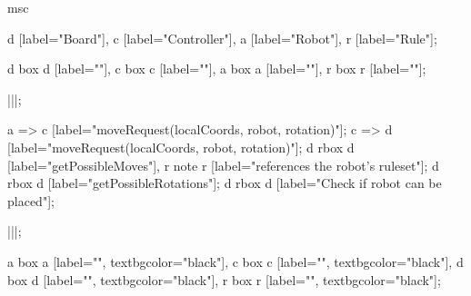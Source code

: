 \begin{msc}
msc
{

d [label="Board"],
c [label="Controller"],
a [label="Robot"],
r [label="Rule"];

d box d [label=""],
c box c [label=""],
a box a [label=""],
r box r [label=""];

|||;

a => c [label="moveRequest(localCoords, robot, rotation)"];
c => d [label="moveRequest(localCoords, robot, rotation)"];
d rbox d [label="getPossibleMoves"], r note r [label="references the robot's ruleset"];
d rbox d [label="getPossibleRotations"];
d rbox d [label="Check if robot can be placed"];

|||;

a box a [label="", textbgcolor="black"],
c box c [label="", textbgcolor="black"],
d box d [label="", textbgcolor="black"],
r box r [label="", textbgcolor="black"];

}
\end{msc}
